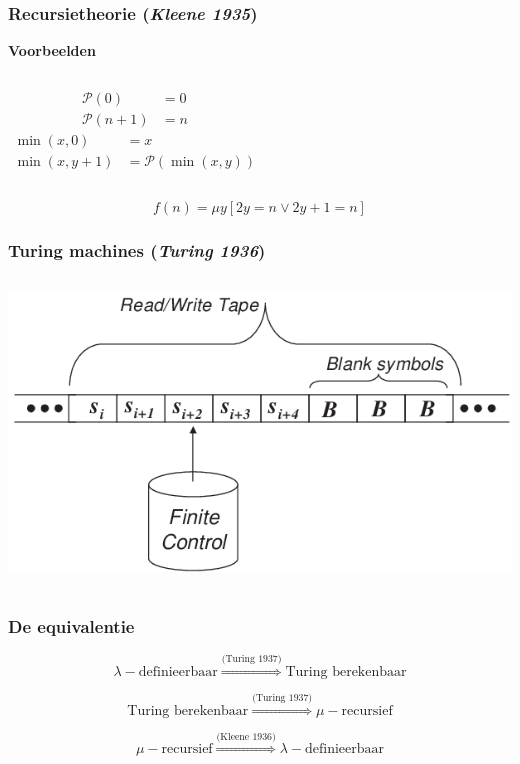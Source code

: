 \documentclass{beamer}
\begin{document}
\begin{frame}
    \frametitle{Recursietheorie (\emph{Kleene 1935})}
    \textbf{Voorbeelden}
    \begin{columns}
            \begin{align*}
                \mathcal{P} (0) & = 0 \\
                \mathcal{P} (n + 1) & = n
            \end{align*}
            \begin{align*}
                \min (x,0) & = x \\
                \min (x, y+1) & = \mathcal{P}(\min (x,y))
            \end{align*}
        \end{columns}
        \vspace{1cm}
        $$f(n) = \mu y [2y= n \vee 2y+1 = n]$$
\end{frame}

\begin{frame}
    \frametitle{Turing machines (\emph{Turing 1936})}
    \begin{columns}
            \includegraphics[width=\textwidth]{tm.png}
    \end{columns}
\end{frame}

\begin{frame}
    \frametitle{De equivalentie}

    $$\lambda-\text{definieerbaar} \stackrel{\scriptscriptstyle \text{(Turing 1937)}}{\Longrightarrow} \text{Turing berekenbaar}$$

    $$\text{Turing berekenbaar} \stackrel{\scriptscriptstyle \text{(Turing 1937)}}{\Longrightarrow} \mu-\text{recursief} $$

    $$\mu-\text{recursief} \stackrel{\scriptscriptstyle \text{(Kleene 1936)}}{\Longrightarrow} \lambda-\text{definieerbaar} $$
\end{frame}
\end{document}
